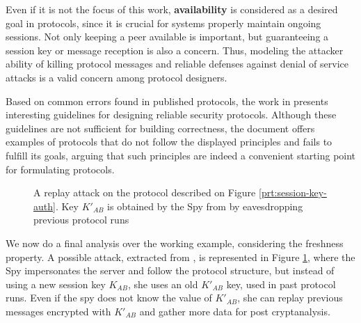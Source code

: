 Even if it is not the focus of this work, \textbf{availability} is considered as a desired goal in protocols, since it is crucial for systems properly maintain ongoing sessions. Not only keeping a peer available is important, but guaranteeing a session key or message reception is also a concern. Thus, modeling the attacker ability of killing protocol messages and reliable defenses against denial of service attacks is a valid concern among protocol designers.

Based on common errors found in published protocols, the work in \cite{AbadiNeedham96} presents interesting guidelines for designing reliable security protocols. Although these guidelines are not sufficient for building correctness, the document offers examples of protocols that do not follow the displayed principles and fails to fulfill its goals, arguing that such principles are indeed a convenient starting point for formulating protocols.

\begin{figure}[!ht]
  \centering

  \caption{A replay attack on the protocol described on Figure \ref{prt:session-key-auth}. Key $K'_{AB}$ is obtained by the Spy from by eavesdropping previous protocol runs}
  \label{fig:attack-ex-replay}
\end{figure}

We now do a final analysis over the working example, considering the freshness property. A possible attack, extracted from \cite{BoydMathuria2008}, is represented in Figure \ref{fig:attack-ex-replay}, where the Spy impersonates the server and follow the protocol structure, but instead of using a new session key $K_{AB}$, she uses an old $K'_{AB}$ key, used in past protocol runs. Even if the spy does not know the value of $K'_{AB}$, she can replay previous messages encrypted with $K'_{AB}$ and gather more data for post cryptanalysis.

